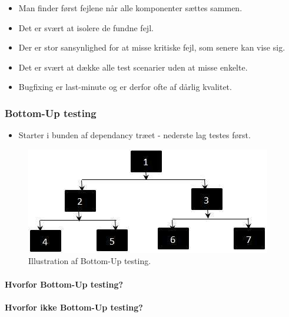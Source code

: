 \begin{itemize}
	\item Man finder først fejlene når alle komponenter sættes sammen.
	\item Det er svært at isolere de fundne fejl.
	\item Der er stor sansynlighed for at misse kritiske fejl, som senere kan vise sig. 
	\item Det er svært at dække alle test scenarier uden at misse enkelte.
	\item Bugfixing er last-minute og er derfor ofte af dårlig kvalitet.
\end{itemize}


\subsubsection{Bottom-Up testing}

\begin{itemize}
	\item Starter i bunden af dependancy træet - nederste lag testes først.
\end{itemize}

\begin{figure}
\centering
\includegraphics[width=0.7\linewidth]{figs/bottomUpFlow.PNG}
\caption{Illustration af Bottom-Up testing.}
\label{fig:bottomUpFlow}
\end{figure}

\paragraph{Hvorfor Bottom-Up testing?}

\paragraph{Hvorfor ikke Bottom-Up testing?}


